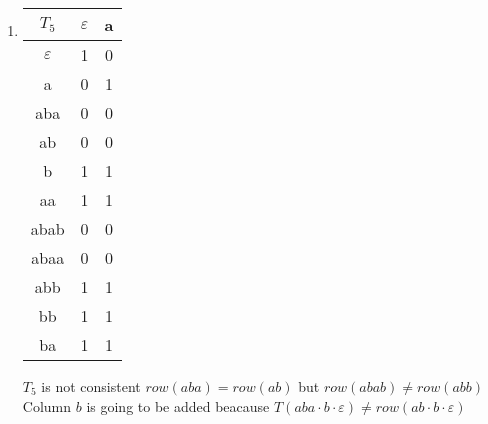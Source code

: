 \begin{enumerate}
  \item \begin{minipage}{0.3\textwidth}
          \begin{tabular}{c||c|c}
            $T_5$         & $\varepsilon$ & a \\
            \hline\hline
            $\varepsilon$ & 1             & 0 \\
            a             & 0             & 1 \\
            aba           & 0             & 0 \\
            ab            & 0             & 0 \\
            b             & 1             & 1 \\
            \hline\hline
            aa            & 1             & 1 \\
            abab          & 0             & 0 \\
            abaa          & 0             & 0 \\
            abb           & 1             & 1 \\
            bb            & 1             & 1 \\
            ba            & 1             & 1 \\
          \end{tabular}
        \end{minipage} \quad
        \begin{minipage}{0.5\textwidth}
          $T_5$ is not consistent $row(aba) = row(ab)$ but $row(abab) \neq row(abb)$
          Column $b$ is going to be added beacause $T(aba \cdot b \cdot \varepsilon) \neq row(ab \cdot b \cdot \varepsilon)$
        \end{minipage}


\end{enumerate}
